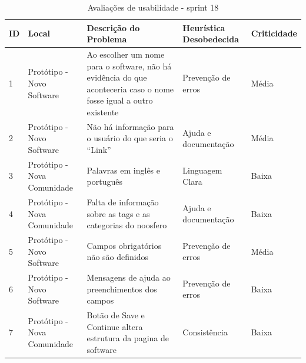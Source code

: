 \begin{table}[h!]
\begin{tabular}{|l|p{3cm}|p{6cm}|p{3cm}|l|}
\hline
\textbf{ID} & \textbf{Local} & \textbf{Descrição do Problema}                                                                                     & \textbf{Heurística Desobedecida} & \textbf{Criticidade} \\ \hline
1           & Protótipo - Novo Software                 & Ao escolher um nome para o software, não há evidência do que aconteceria caso o nome fosse igual a outro existente & Prevenção de erros               & Média                \\ \hline
2           & Protótipo - Novo Software                 & Não há informação para o usuário do que seria o ``Link''                                                             & Ajuda e documentação             & Média                \\ \hline
3           & Protótipo - Nova Comunidade               & Palavras em inglês e português                                                                                     & Linguagem Clara                   & Baixa                \\ \hline
4           & Protótipo - Nova Comunidade               & Falta de informação sobre as tags e as categorias do noosfero                                                      & Ajuda e documentação             & Baixa                \\ \hline
5           & Protótipo - Novo Software                 & Campos obrigatórios não são definidos                                                                              & Prevenção de erros               & Média                \\ \hline
6           & Protótipo - Novo Software    & Mensagens de ajuda ao preenchimentos dos campos                                                                    & Prevenção de erros               & Baixa                \\ \hline
7           & Protótipo - Nova Comunidade               & Botão de Save e Continue altera estrutura da pagina de software                                                    & Consistência                     & Baixa                \\ \hline
\end{tabular}

\caption{Avaliações de usabilidade - sprint 18}
\label{table_1a}
\end{table}


